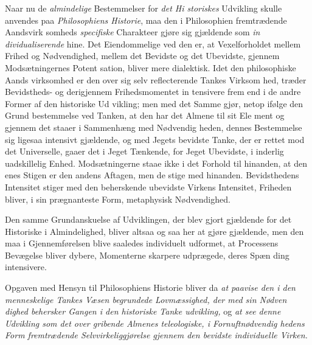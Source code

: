 Naar nu de \emph{almindelige} Bestemmelser for \emph{det Hi\-%
storiskes} Udvikling skulle anvendes paa \emph{Philosophiens
Historie}, maa den i Philosophien fremtrædende Aandsvirk\-%
somheds \emph{specifiske} Charakteer gjøre sig gjældende som \emph{in\-%
dividualiserende} hine. Det Eiendommelige ved den er, at
Vexelforholdet mellem Frihed og Nødvendighed, mellem det
Bevidste og det Ubevidste, gjennem Modsætningernes Potent\-%
sation, bliver mere dialektisk. Idet den philosophiske Aands\-%
virksomhed er den over sig selv reflecterende Tankes Virksom\-%
hed, træder Bevidstheds- og derigjennem Frihedsmomentet in\-%
tensivere frem end i de andre Former af den historiske Ud\-%
vikling; men med det Samme gjør, netop ifølge den Grund\-%
bestemmelse ved Tanken, at den har det Almene til sit Ele\-%
ment og gjennem det staaer i Sammenhæng med Nødvendig\-%
heden, dennes Bestemmelse sig ligesaa intensivt gjældende, og
med Jegets bevidste Tanke, der er rettet mod det Universelle,
gaaer det i Jeget Tænkende, for Jeget Ubevidste, i inderlig
uadskillelig Enhed. Modsætningerne staae ikke i det Forhold
til hinanden, at den enes Stigen er den andens Aftagen, men
de stige med hinanden. Bevidsthedens Intensitet stiger med
den beherskende ubevidste Virkens Intensitet, Friheden bliver,
i sin prægnanteste Form, metaphysisk Nødvendighed.

Den samme Grundanskuelse af Udviklingen, der blev gjort
gjældende for det Historiske i Almindelighed, bliver altsaa og\-%
saa her at gjøre gjældende, men den maa i Gjennemførelsen
blive saaledes individuelt udformet, at Processens Bevægelse
bliver dybere, Momenterne skarpere udprægede, deres Spæn\-%
ding intensivere.

Opgaven med Hensyn til Philosophiens Historie bliver da
\emph{at paavise den i den menneskelige Tankes Væsen
begrundede Lovmæssighed, der med sin Nødven\-%
dighed behersker Gangen i den historiske Tanke\-%
udvikling,} og \emph{at see denne Udvikling som det over\-%
gribende Almenes teleologiske, i Fornuftnødvendig\-%
hedens Form fremtrædende Selvvirkeliggjørelse
gjennem den bevidste individuelle Virken.}

